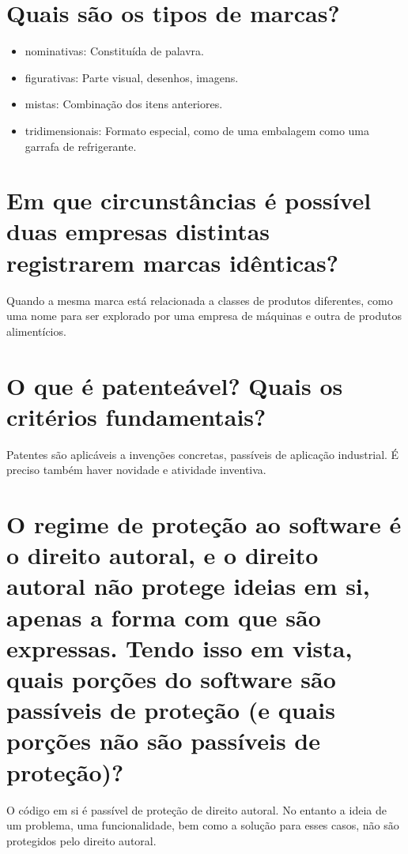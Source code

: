 \documentclass[a4paper,10pt]{article}
\begin{document}
\section{Quais são os tipos de marcas?}

\begin{itemize}

\item nominativas: Constituída de palavra.
\item figurativas: Parte visual, desenhos, imagens.
\item mistas: Combinação dos itens anteriores.
\item tridimensionais: Formato especial, como de uma embalagem como uma garrafa de refrigerante.

\end{itemize}


\section{Em que circunstâncias é possível duas empresas distintas registrarem marcas idênticas?}

Quando a mesma marca está relacionada a classes de produtos diferentes, como uma nome para ser explorado por uma empresa de máquinas e outra de produtos alimentícios.

\section{O que é patenteável? Quais os critérios fundamentais?}

Patentes são aplicáveis a invenções concretas, passíveis de aplicação industrial. É preciso também haver novidade e atividade inventiva.

\section{O regime de proteção ao software é o direito autoral, e o direito autoral não protege ideias em si, apenas a forma com que são expressas. Tendo isso em vista, quais porções do software são passíveis de proteção (e quais porções não são passíveis de proteção)?}

O código em si é passível de proteção de direito autoral. No entanto a ideia de um problema, uma funcionalidade, bem como a solução para esses casos, não são protegidos pelo direito autoral.
\end{document}
